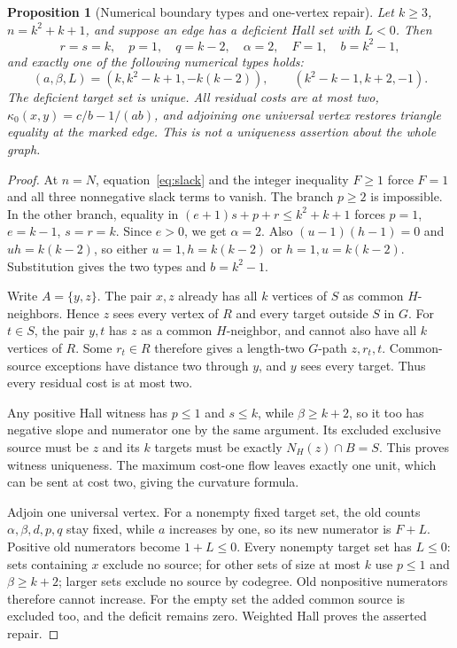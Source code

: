 \documentclass[11pt]{article}
\newtheorem{proposition}[theorem]{Proposition}
\theoremstyle{remark}
\begin{document}
\begin{proposition}[Numerical boundary types and one-vertex repair]\label{prop:boundary}
Let $k\ge3$, $n=k^2+k+1$, and suppose an edge has a deficient Hall set with $L<0$. Then
\[
 r=s=k,\quad p=1,\quad q=k-2,\quad\alpha=2,\quad F=1,\quad b=k^2-1,
\]
and exactly one of the following numerical types holds:
\[
 (a,\beta,L)=(k,k^2-k+1,-k(k-2)),\qquad
 (k^2-k-1,k+2,-1).
\]
The deficient target set is unique. All residual costs are at most two,
$\kappa_0(x,y)=c/b-1/(ab)$, and adjoining one universal vertex restores triangle equality at the marked edge. This is not a uniqueness assertion about the whole graph.
\end{proposition}
\begin{proof}
At $n=N$, equation~\eqref{eq:slack} and the integer inequality $F\ge1$ force $F=1$ and all three nonnegative slack terms to vanish. The branch $p\ge2$ is impossible. In the other branch, equality in $(e+1)s+p+r\le k^2+k+1$ forces $p=1$, $e=k-1$, $s=r=k$. Since $e>0$, we get $\alpha=2$. Also $(u-1)(h-1)=0$ and $uh=k(k-2)$, so either $u=1,h=k(k-2)$ or $h=1,u=k(k-2)$. Substitution gives the two types and $b=k^2-1$.

Write $A=\{y,z\}$. The pair $x,z$ already has all $k$ vertices of $S$ as common $H$-neighbors. Hence $z$ sees every vertex of $R$ and every target outside $S$ in $G$. For $t\in S$, the pair $y,t$ has $z$ as a common $H$-neighbor, and cannot also have all $k$ vertices of $R$. Some $r_t\in R$ therefore gives a length-two $G$-path $z,r_t,t$. Common-source exceptions have distance two through $y$, and $y$ sees every target. Thus every residual cost is at most two.

Any positive Hall witness has $p\le1$ and $s\le k$, while $\beta\ge k+2$, so it too has negative slope and numerator one by the same argument. Its excluded exclusive source must be $z$ and its $k$ targets must be exactly $N_H(z)\cap B=S$. This proves witness uniqueness. The maximum cost-one flow leaves exactly one unit, which can be sent at cost two, giving the curvature formula.

Adjoin one universal vertex. For a nonempty fixed target set, the old counts $\alpha,\beta,d,p,q$ stay fixed, while $a$ increases by one, so its new numerator is $F+L$. Positive old numerators become $1+L\le0$. Every nonempty target set has $L\le0$: sets containing $x$ exclude no source; for other sets of size at most $k$ use $p\le1$ and $\beta\ge k+2$; larger sets exclude no source by codegree. Old nonpositive numerators therefore cannot increase. For the empty set the added common source is excluded too, and the deficit remains zero. Weighted Hall proves the asserted repair.
\end{proof}
\end{document}
